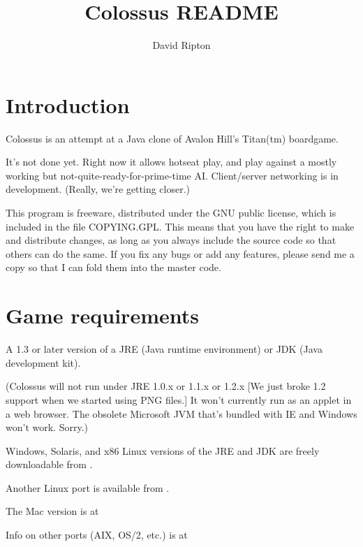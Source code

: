 \documentclass{article}
\begin{document}

\title{Colossus README}

\author{David Ripton}

\maketitle

\section*{Introduction}

Colossus is an attempt at a Java clone of Avalon Hill's Titan(tm) boardgame.

It's not done yet. Right now it allows hotseat play, and play against a
mostly working but not-quite-ready-for-prime-time AI. Client/server 
networking is in development. (Really, we're getting closer.)

This program is freeware, distributed under the GNU public license, which
is included in the file COPYING.GPL. This means that you have the right to
make and distribute changes, as long as you always include the source code
so that others can do the same. If you fix any bugs or add any features,
please send me a copy so that I can fold them into the master code.

\section{Game requirements}

A 1.3 or later version of a JRE (Java runtime environment) or JDK (Java development kit). 

(Colossus will not run under JRE 1.0.x or 1.1.x or 1.2.x  [We just broke 1.2
support when we started using PNG files.]  It won't currently run as an applet 
in a web browser. The obsolete Microsoft JVM that's bundled with IE and Windows 
won't work. Sorry.)

Windows, Solaris, and x86 Linux versions of the JRE and JDK are freely 
downloadable from .

Another Linux port is available from
.

The Mac version is at

Info on other ports (AIX, OS/2, etc.) is at 
\end{document}
